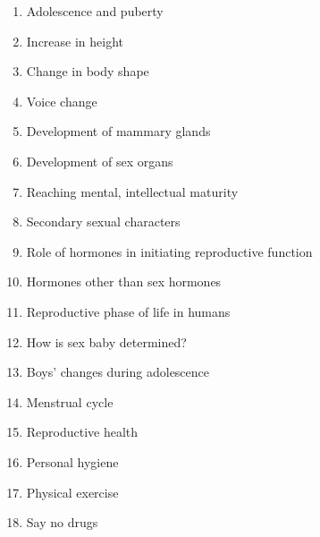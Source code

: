 \documentclass[12pt a4paper]{article}
\begin{document}
\begin{landscape}
\begin{multicols*}{2}
\begin{small}
\begin{multicols*}{2}
\begin{enumerate}
    \item Adolescence and puberty
    \item Increase in height
    \item Change in body shape
    \item Voice change
    \item Development of mammary glands 
    \item Development of sex organs 
    \item Reaching mental, intellectual maturity 
    \item Secondary sexual characters 
    \item Role of hormones in initiating reproductive function 
    \item Hormones other than sex hormones 
    \item Reproductive phase of life in humans 
    \item How is sex baby determined?  
    \item Boys' changes during adolescence  
    \item Menstrual cycle  
    \item Reproductive health  
    \item Personal hygiene   
    \item Physical exercise   
    \item Say no drugs
\end{enumerate}
    
\end{multicols*}





\end{small}
\end{multicols*}
\end{landscape}
\end{document}
